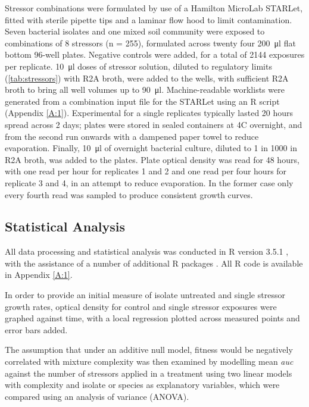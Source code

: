 \documentclass[final,1p,times]{elsarticle}
\begin{document}
Stressor combinations were formulated by use of a Hamilton MicroLab STARLet, fitted with sterile  pipette tips and a laminar flow hood to limit contamination. Seven bacterial isolates and one mixed soil community were exposed to combinations of 8 stressors (n = 255), formulated across twenty four \SI{200}{\ul} flat bottom 96-well plates. Negative controls were added, for a total of 2144 exposures per replicate. \SI{10}{\ul} doses of stressor solution, diluted to regulatory limits (\cref{tab:stressors}) with R2A broth, were added to the wells, with sufficient R2A broth to bring all well volumes up to \SI{90}{\ul}. Machine-readable worklists were generated from a combination input file for the STARLet using an R script (Appendix \ref{A:1}). Experimental for a single replicates typically lasted 20 hours spread across 2 days; plates were stored in sealed containers at 4\textdegree C overnight, and from the second run onwards with a dampened paper towel to reduce evaporation. Finally, \SI{10}{\ul} of overnight bacterial culture, diluted to 1 in 1000 in R2A broth, was added to the plates. Plate optical density was read for 48 hours, with one read per hour for replicates 1 and 2 and one read per four hours for replicate 3 and 4, in an attempt to reduce evaporation. In the former case only every fourth read was sampled to produce consistent growth curves. 

\subsection{Statistical Analysis}
\label{S:2:6}
All data processing and statistical analysis was conducted in R version 3.5.1 \cite{RCoreTeam2018}, with the assistance of a number of additional R packages \cite{Auguie2017, Murrell2014,Garnier2018,Wickham2018b,Wickham2018c,Gagolewski2018,Bache2014,Muller2017,Kassambara2018,Wickham2016,Wickham2018a,Wickham2018}. All R code is available in Appendix \ref{A:1}.

In order to provide an initial measure of isolate untreated and single stressor growth rates, optical density for control and single stressor exposures were graphed against time, with a local regression plotted across measured points and error bars added. 

The assumption that under an additive null model, fitness would be negatively correlated with mixture complexity was then examined by modelling mean \textit{auc} against the number of stressors applied in a treatment  using two linear models with complexity and isolate or species as explanatory variables, which were compared using an analysis of variance (ANOVA). 
\end{document}
